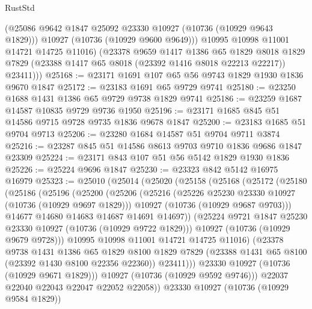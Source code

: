 \begin{lexlean}{RustStd}
\begin{coremodule}
            (@25086 @9642 @1847 @25092 @23330 @10927 (@10736 (@10929 @9643 @1829)))
            @10927
            (@10736 (@10929 @9600 @9649)))
          @10995
          @10998
          @11001
          @14721
          @14725
          @11016)
        (@23378
          @9659
          @1417
          @1386
          @65
          @1829
          @8018
          @1829
          @7829
          (@23388 @1417 @65 @8018 (@23392 @1416 @8018 @22213 @22217))
          @23411)))
@25168 := @23171 @1691 @107 @65 @56 @9743 @1829 @1930 @1836 @9670 @1847
@25172 := @23183 @1691 @65 @9729 @9741
@25180 := @23250 @1688 @1431 @1386 @65 @9729 @9738 @1829 @9741
@25186 := @23259 @1687 @14587 @10835 @9729 @9736 @1950
@25196 := @23171 @1685 @845 @51 @14586 @9715 @9728 @9735 @1836 @9678 @1847
@25200 := @23183 @1685 @51 @9704 @9713
@25206 := @23280 @1684 @14587 @51 @9704 @9711 @3874
@25216 := @23287 @845 @51 @14586 @8613 @9703 @9710 @1836 @9686 @1847 @23309
@25224 := @23171 @843 @107 @51 @56 @5142 @1829 @1930 @1836
@25226 := @25224 @9696 @1847
@25230 := @23323 @842 @5142 @16975 @16979
@25323 := @25010
    (@25014
      (@25020
        (@25158
          (@25168
            (@25172
              (@25180
                (@25186
                  (@25196
                    (@25200
                      (@25206
                        (@25216
                          (@25226 @25230 @23330 @10927 (@10736 (@10929 @9697 @1829)))
                          @10927
                          (@10736 (@10929 @9687 @9703)))
                        @14677
                        @14680
                        @14683
                        @14687
                        @14691
                        @14697))
                    (@25224 @9721 @1847 @25230 @23330 @10927 (@10736 (@10929 @9722 @1829)))
                    @10927
                    (@10736 (@10929 @9679 @9728)))
                  @10995
                  @10998
                  @11001
                  @14721
                  @14725
                  @11016)
                (@23378
                  @9738
                  @1431
                  @1386
                  @65
                  @1829
                  @8100
                  @1829
                  @7829
                  (@23388 @1431 @65 @8100 (@23392 @1430 @8100 @22356 @22360))
                  @23411)))
            @23330
            @10927
            (@10736 (@10929 @9671 @1829)))
          @10927
          (@10736 (@10929 @9592 @9746)))
        @22037
        @22040
        @22043
        @22047
        @22052
        @22058))
    @23330
    @10927
    (@10736 (@10929 @9584 @1829))

\end{coremodule}
\end{lexlean}
